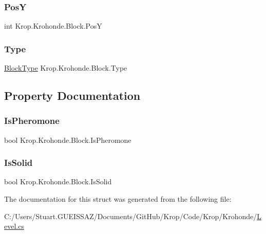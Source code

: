 \subsubsection{\texorpdfstring{PosY}{PosY}}
{\footnotesize\ttfamily int Krop.\+Krohonde.\+Block.\+PosY}

\mbox{\label{struct_krop_1_1_krohonde_1_1_block_ae0536d7f9addc778b31ff9698a3912ea}} 
\subsubsection{\texorpdfstring{Type}{Type}}
{\footnotesize\ttfamily \mbox{\hyperlink{namespace_krop_1_1_krohonde_ae5fde399eea87be9e3c80744c3d73029}{Block\+Type}} Krop.\+Krohonde.\+Block.\+Type}



\subsection{Property Documentation}
\mbox{\label{struct_krop_1_1_krohonde_1_1_block_ada38670f895fb49ce83bdd2e611763ca}} 
\subsubsection{\texorpdfstring{Is\+Pheromone}{IsPheromone}}
{\footnotesize\ttfamily bool Krop.\+Krohonde.\+Block.\+Is\+Pheromone\hspace{0.3cm}{\ttfamily [get]}}

\mbox{\label{struct_krop_1_1_krohonde_1_1_block_a1e8933c939ea3cafbe9e25bdade26de6}} 
\subsubsection{\texorpdfstring{Is\+Solid}{IsSolid}}
{\footnotesize\ttfamily bool Krop.\+Krohonde.\+Block.\+Is\+Solid\hspace{0.3cm}{\ttfamily [get]}}



The documentation for this struct was generated from the following file\+:\begin{DoxyCompactItemize}
\item 
C\+:/\+Users/\+Stuart.\+G\+U\+E\+I\+S\+S\+A\+Z/\+Documents/\+Git\+Hub/\+Krop/\+Code/\+Krop/\+Krohonde/\mbox{\hyperlink{_level_8cs}{Level.\+cs}}\end{DoxyCompactItemize}
